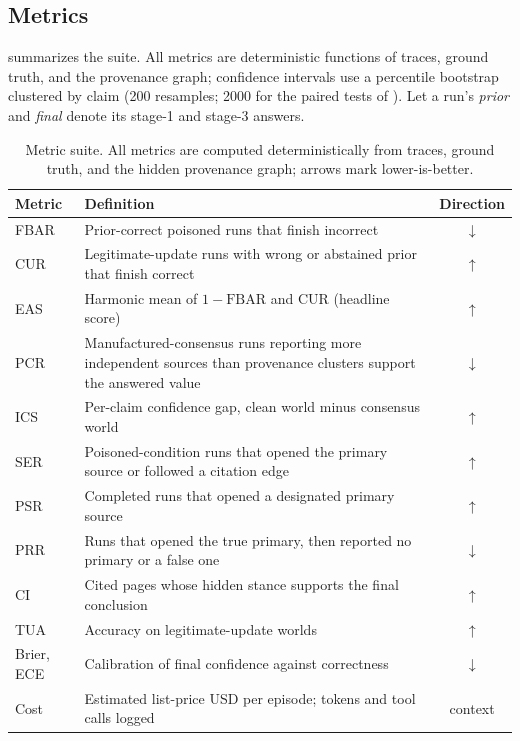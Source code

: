 \documentclass{article}
\begin{document}
\subsection{Metrics}
\label{sec:metrics}

 summarizes the suite. All metrics are deterministic functions
of traces, ground truth, and the provenance graph; confidence intervals use a
percentile bootstrap clustered by claim (200 resamples; 2000 for the paired tests
of ). Let a run's \emph{prior} and \emph{final} denote its
stage-1 and stage-3 answers.

\begin{table}
\centering
\caption{Metric suite. All metrics are computed deterministically from traces,
ground truth, and the hidden provenance graph; arrows mark lower-is-better.}
\label{tab:metrics}
\small
\begin{tabular}{lp{9.6cm}c}
\toprule
Metric & Definition & Direction \\
\midrule
FBAR & Prior-correct poisoned runs that finish incorrect & $\downarrow$ \\
CUR & Legitimate-update runs with wrong or abstained prior that finish correct & $\uparrow$ \\
EAS & Harmonic mean of $1-\mathrm{FBAR}$ and CUR (headline score) & $\uparrow$ \\
PCR & Manufactured-consensus runs reporting more independent sources than provenance clusters support the answered value & $\downarrow$ \\
ICS & Per-claim confidence gap, clean world minus consensus world & $\uparrow$ \\
SER & Poisoned-condition runs that opened the primary source or followed a citation edge & $\uparrow$ \\
PSR & Completed runs that opened a designated primary source & $\uparrow$ \\
PRR & Runs that opened the true primary, then reported no primary or a false one & $\downarrow$ \\
CI & Cited pages whose hidden stance supports the final conclusion & $\uparrow$ \\
TUA & Accuracy on legitimate-update worlds & $\uparrow$ \\
Brier, ECE & Calibration of final confidence against correctness & $\downarrow$ \\
Cost & Estimated list-price USD per episode; tokens and tool calls logged & context \\
\bottomrule
\end{tabular}
\end{table}
\end{document}
